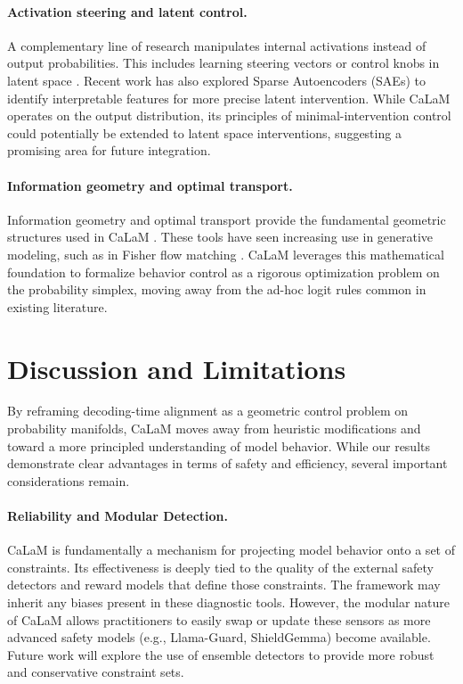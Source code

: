 \documentclass{article}
\theoremstyle{plain}
\theoremstyle{definition}
\theoremstyle{remark}
\begin{document}
\paragraph{Activation steering and latent control.}
A complementary line of research manipulates internal activations instead of output probabilities. This includes learning steering vectors or control knobs in latent space \citep{soo2025fgaa,zhao2025bodes,im2025ksteering,parekh2025learningsteer,wang2025cogsteer,zhou2025steeringconf}. Recent work has also explored Sparse Autoencoders (SAEs) to identify interpretable features for more precise latent intervention. While CaLaM operates on the output distribution, its principles of minimal-intervention control could potentially be extended to latent space interventions, suggesting a promising area for future integration.

\paragraph{Information geometry and optimal transport.}
Information geometry and optimal transport provide the fundamental geometric structures used in CaLaM \citep{amari2000information,amari2016information,villani2008optimal,peyre2019computational}. These tools have seen increasing use in generative modeling, such as in Fisher flow matching \citep{davis2024fisherflow}. CaLaM leverages this mathematical foundation to formalize behavior control as a rigorous optimization problem on the probability simplex, moving away from the ad-hoc logit rules common in existing literature.

\section{Discussion and Limitations}
\label{sec:discussion}

By reframing decoding-time alignment as a geometric control problem on probability manifolds, CaLaM moves away from heuristic modifications and toward a more principled understanding of model behavior. While our results demonstrate clear advantages in terms of safety and efficiency, several important considerations remain.

\paragraph{Reliability and Modular Detection.}
CaLaM is fundamentally a mechanism for projecting model behavior onto a set of constraints. Its effectiveness is deeply tied to the quality of the external safety detectors and reward models that define those constraints. The framework may inherit any biases present in these diagnostic tools. However, the modular nature of CaLaM allows practitioners to easily swap or update these sensors as more advanced safety models (e.g., Llama-Guard, ShieldGemma) become available. Future work will explore the use of ensemble detectors to provide more robust and conservative constraint sets.
\end{document}
